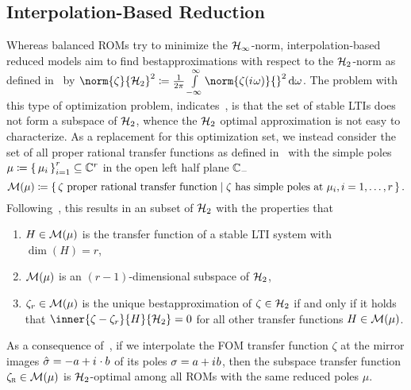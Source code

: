 \subsection{Interpolation-Based Reduction}\label{subsec:interpolation-reduction}

Whereas balanced \acp{ROM} try to minimize the $\mathcal{H}_\infty$-norm, interpolation-based reduced models aim to find bestapproximations with respect to the $\mathcal{H}_2$-norm as defined in~\cite[Section~3]{Gugercin2008} by $\norm{\zeta}{\mcl{H}_2}^2 \coloneqq \frac{1}{2 \pi} \int\limits_{- \infty}^\infty \norm{\zeta(\iu \omega)}{}^2 \dif \omega$.
The problem with this type of optimization problem, indicates~\cite[Section~3.1]{Gugercin2008}, is that the set of stable \acp{LTI} does not form a subspace of $\mathcal{H}_2$, whence the $\mathcal{H}_2$ optimal approximation is not easy to characterize.
As a replacement for this optimization set, we instead consider the set of all proper rational transfer functions as defined in~\cite[Section~1.3.1]{Corless2003} with the simple poles $\mu \coloneqq {\left\{\,\mu_i\,\right\}}_{i = 1}^r \subseteq \mathbb{C}^r$ in the open left half plane $\mathbb{C}_{-}$
\begin{equation*}
    \mathcal{M}(\mu) \coloneqq \left\{\,\zeta \text{ proper rational transfer function}\mid\zeta \text{ has simple poles at } \mu_i, i = 1, \dots, r\,\right\}.
\end{equation*}
Following~\cite[Theorem~3.1]{Gugercin2008}, this results in an subset of $\mathcal{H}_2$ with the properties that
\begin{enumerate}
    \item $H \in \mathcal{M}(\mu)$ is the transfer function of a stable \ac{LTI} system with $\dim{(H)} = r$,
    \item $\mathcal{M}(\mu)$ is an $(r - 1)$-dimensional subspace of $\mathcal{H}_2$,
    \item $\zeta_r \in \mathcal{M}(\mu)$ is the unique bestapproximation of $\zeta \in \mathcal{H}_2$ if and only if it holds that $\inner{\zeta - \zeta_r}{H}{\mcl{H}_2} = 0$ for all other transfer functions $H \in \mathcal{M}(\mu)$.
\end{enumerate}
As a consequence of~\cite[Theorem~3.1]{Gugercin2008}, if we interpolate the \ac{FOM} transfer function $\zeta$ at the mirror images $\hat{\sigma} = -a + {i\mkern1mu} \cdot b$ of its poles $\sigma = a + {i\mkern1mu} b$, then the subspace transfer function $\zeta_{\textnormal{\scshape r}} \in \mathcal{M}(\mu)$ is $\mathcal{H}_2$-optimal among all \acp{ROM} with the same reduced poles $\mu$.

